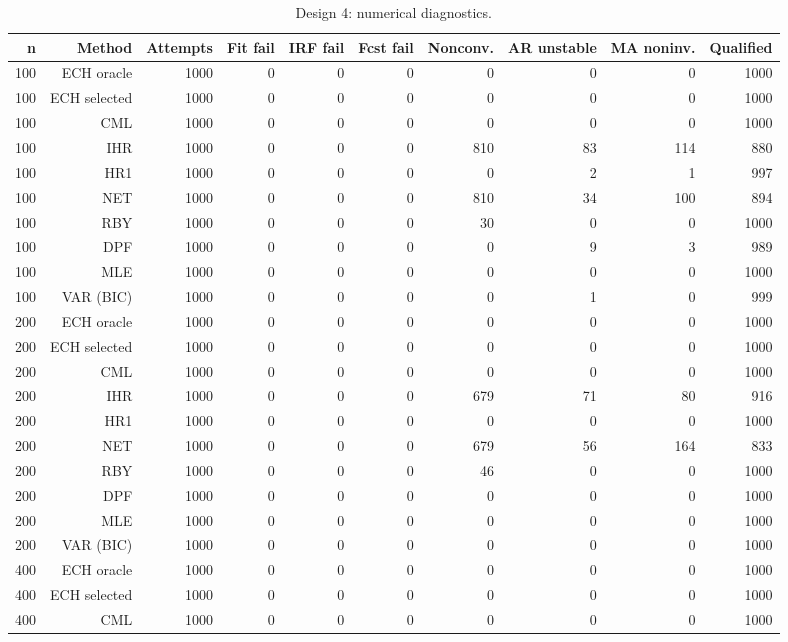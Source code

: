 \begin{table}[p]\centering
\caption{Design 4: numerical diagnostics.}
\small
\begin{tabular}{rrrrrrrrrr}\toprule
n & Method & Attempts & Fit fail & IRF fail & Fcst fail & Nonconv. & AR unstable & MA noninv. & Qualified \\\midrule
100 & ECH oracle & 1000 & 0 & 0 & 0 &   0 &  0 &   0 & 1000 \\
100 & ECH selected & 1000 & 0 & 0 & 0 &   0 &  0 &   0 & 1000 \\
100 & CML & 1000 & 0 & 0 & 0 &   0 &  0 &   0 & 1000 \\
100 & IHR & 1000 & 0 & 0 & 0 & 810 & 83 & 114 &  880 \\
100 & HR1 & 1000 & 0 & 0 & 0 &   0 &  2 &   1 &  997 \\
100 & NET & 1000 & 0 & 0 & 0 & 810 & 34 & 100 &  894 \\
100 & RBY & 1000 & 0 & 0 & 0 &  30 &  0 &   0 & 1000 \\
100 & DPF & 1000 & 0 & 0 & 0 &   0 &  9 &   3 &  989 \\
100 & MLE & 1000 & 0 & 0 & 0 &   0 &  0 &   0 & 1000 \\
100 & VAR (BIC) & 1000 & 0 & 0 & 0 &   0 &  1 &   0 &  999 \\
200 & ECH oracle & 1000 & 0 & 0 & 0 &   0 &  0 &   0 & 1000 \\
200 & ECH selected & 1000 & 0 & 0 & 0 &   0 &  0 &   0 & 1000 \\
200 & CML & 1000 & 0 & 0 & 0 &   0 &  0 &   0 & 1000 \\
200 & IHR & 1000 & 0 & 0 & 0 & 679 & 71 &  80 &  916 \\
200 & HR1 & 1000 & 0 & 0 & 0 &   0 &  0 &   0 & 1000 \\
200 & NET & 1000 & 0 & 0 & 0 & 679 & 56 & 164 &  833 \\
200 & RBY & 1000 & 0 & 0 & 0 &  46 &  0 &   0 & 1000 \\
200 & DPF & 1000 & 0 & 0 & 0 &   0 &  0 &   0 & 1000 \\
200 & MLE & 1000 & 0 & 0 & 0 &   0 &  0 &   0 & 1000 \\
200 & VAR (BIC) & 1000 & 0 & 0 & 0 &   0 &  0 &   0 & 1000 \\
400 & ECH oracle & 1000 & 0 & 0 & 0 &   0 &  0 &   0 & 1000 \\
400 & ECH selected & 1000 & 0 & 0 & 0 &   0 &  0 &   0 & 1000 \\
400 & CML & 1000 & 0 & 0 & 0 &   0 &  0 &   0 & 1000 \\

\end{tabular}
\end{table}

